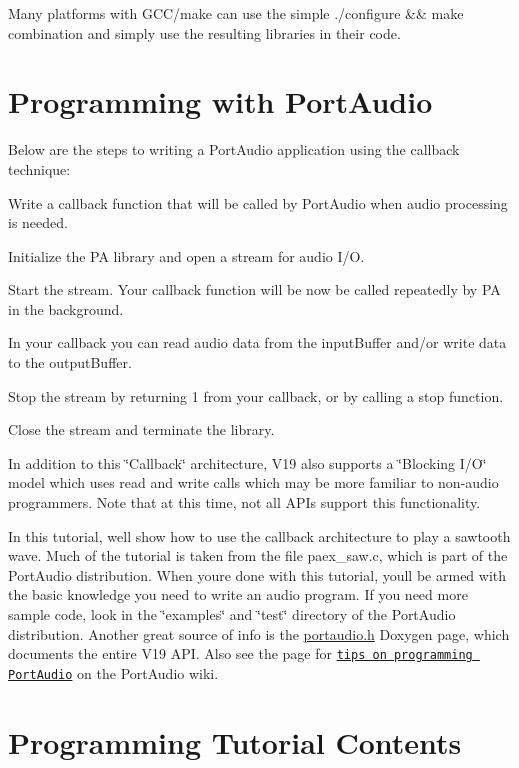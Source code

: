Many platforms with G\+C\+C/make can use the simple ./configure \&\& make combination and simply use the resulting libraries in their code.\hypertarget{tutorial_start_tut_start3}{}\section{Programming with Port\+Audio}\label{tutorial_start_tut_start3}
Below are the steps to writing a Port\+Audio application using the callback technique\+:


\begin{DoxyItemize}
\item Write a callback function that will be called by Port\+Audio when audio processing is needed.
\item Initialize the PA library and open a stream for audio I/O.
\item Start the stream. Your callback function will be now be called repeatedly by PA in the background.
\item In your callback you can read audio data from the input\+Buffer and/or write data to the output\+Buffer.
\item Stop the stream by returning 1 from your callback, or by calling a stop function.
\item Close the stream and terminate the library.
\end{DoxyItemize}

In addition to this \char`\"{}\+Callback\char`\"{} architecture, V19 also supports a \char`\"{}\+Blocking I/\+O\char`\"{} model which uses read and write calls which may be more familiar to non-\/audio programmers. Note that at this time, not all A\+P\+Is support this functionality.

In this tutorial, we\textquotesingle{}ll show how to use the callback architecture to play a sawtooth wave. Much of the tutorial is taken from the file paex\+\_\+saw.\+c, which is part of the Port\+Audio distribution. When you\textquotesingle{}re done with this tutorial, you\textquotesingle{}ll be armed with the basic knowledge you need to write an audio program. If you need more sample code, look in the \char`\"{}examples\char`\"{} and \char`\"{}test\char`\"{} directory of the Port\+Audio distribution. Another great source of info is the \hyperlink{portaudio_8h}{portaudio.\+h} Doxygen page, which documents the entire V19 A\+PI. Also see the page for \href{http://www.assembla.com/spaces/portaudio/wiki/Tips}{\tt tips on programming Port\+Audio} on the Port\+Audio wiki.\hypertarget{tutorial_start_tut_start4}{}\section{Programming Tutorial Contents}\label{tutorial_start_tut_start4}

